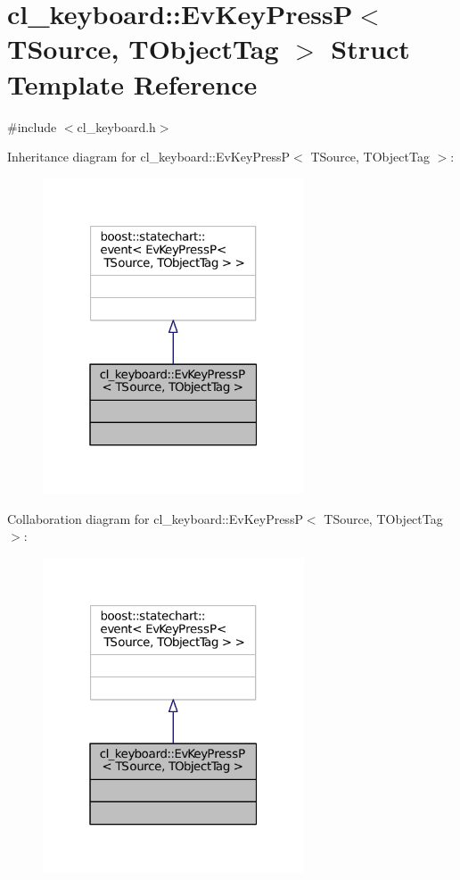 \hypertarget{structcl__keyboard_1_1EvKeyPressP}{}\section{cl\+\_\+keyboard\+:\+:Ev\+Key\+PressP$<$ T\+Source, T\+Object\+Tag $>$ Struct Template Reference}
\label{structcl__keyboard_1_1EvKeyPressP}


{\ttfamily \#include $<$cl\+\_\+keyboard.\+h$>$}



Inheritance diagram for cl\+\_\+keyboard\+:\+:Ev\+Key\+PressP$<$ T\+Source, T\+Object\+Tag $>$\+:
\nopagebreak
\begin{figure}[H]
\begin{center}
\leavevmode
\includegraphics[width=220pt]{structcl__keyboard_1_1EvKeyPressP__inherit__graph}
\end{center}
\end{figure}


Collaboration diagram for cl\+\_\+keyboard\+:\+:Ev\+Key\+PressP$<$ T\+Source, T\+Object\+Tag $>$\+:
\nopagebreak
\begin{figure}[H]
\begin{center}
\leavevmode
\includegraphics[width=220pt]{structcl__keyboard_1_1EvKeyPressP__coll__graph}
\end{center}
\end{figure}


